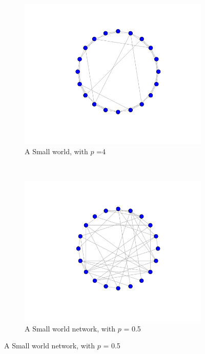 \begin{figure}[h]
    \centering
    \begin{subfigure}[b]{0.4\textwidth}
        \includegraphics[scale=0.4]{images/sw_p1.png} 
        \caption{A Small world, with $p$ =4}
        \label{fig:gull}
    \end{subfigure}
    ~ %
    \begin{subfigure}[b]{0.4\textwidth}
        \includegraphics[scale=0.4]{images/sw_p5.png} 
        \caption{A Small world network, with $p$ = 0.5}

\end{subfigure}
\end{figure}
